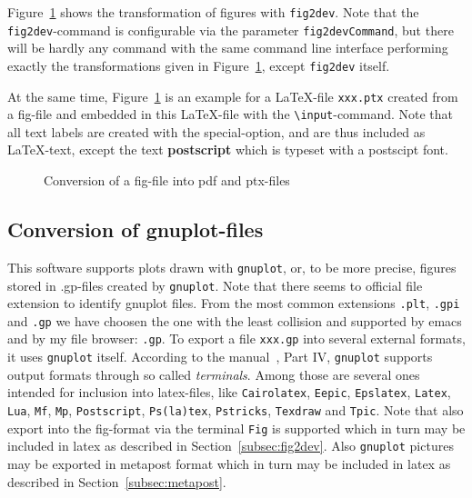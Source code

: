 \documentclass[12pt]{article}
\begin{document}
Figure~\ref{fig:fig2dev} shows the transformation 
of figures with {\tt fig2dev}. 
Note that the {\tt fig2dev}-command is configurable 
via the parameter {\tt fig2devCommand}, 
but there will be hardly any command with the same command line interface 
performing exactly the transformations given in Figure~\ref{fig:fig2dev}, 
except {\tt fig2dev} itself. 

At the same time, Figure~\ref{fig:fig2dev} is an example 
for a \LaTeX-file {\tt xxx.ptx} created from a fig-file 
and embedded in this \LaTeX-file 
with the {\tt\textbackslash input}-command. 
Note that all text labels are created with the special-option, 
and are thus included as \LaTeX-text, 
except the text {\bf\tiny postscript} 
which is typeset with a postscipt font. 


\begin{figure}[htb]
\begin{center}

\end{center}
\caption{\label{fig:fig2dev}Conversion of a fig-file into pdf and ptx-files}
\end{figure}


\subsection{Conversion of gnuplot-files}\label{subsec:gnuplot2pdf}

This software supports plots drawn with {\tt gnuplot}, or, to be more precise, 
figures stored in .gp-files created by {\tt gnuplot}. 
Note that there seems to official file extension 
to identify gnuplot files. 
From the most common extensions {\tt.plt}, {\tt.gpi} and {\tt.gp} 
we have choosen the one with the least collision 
and supported by emacs and by my file browser: {\tt.gp}. 
To export a file {\tt xxx.gp} into several external formats, 
it uses {\tt gnuplot} itself. 
According to the manual~\cite{GnuPlot}, Part IV, 
{\tt gnuplot} supports output formats through so called {\em terminals}. 
Among those are several ones intended for inclusion into latex-files, 
like {\tt Cairolatex}, {\tt Eepic}, {\tt Epslatex}, {\tt Latex}, {\tt Lua}, 
{\tt Mf}, {\tt Mp}, {\tt Postscript}, {\tt Ps(la)tex}, {\tt Pstricks}, 
{\tt Texdraw} and {\tt Tpic}. 
Note that also export into the fig-format via the terminal {\tt Fig} 
is supported which in turn may be included in latex 
as described in Section~\ref{subsec:fig2dev}. 
Also {\tt gnuplot} pictures may be exported in metapost format 
which in turn may be included in latex 
as described in Section~\ref{subsec:metapost}. 
\end{document}
